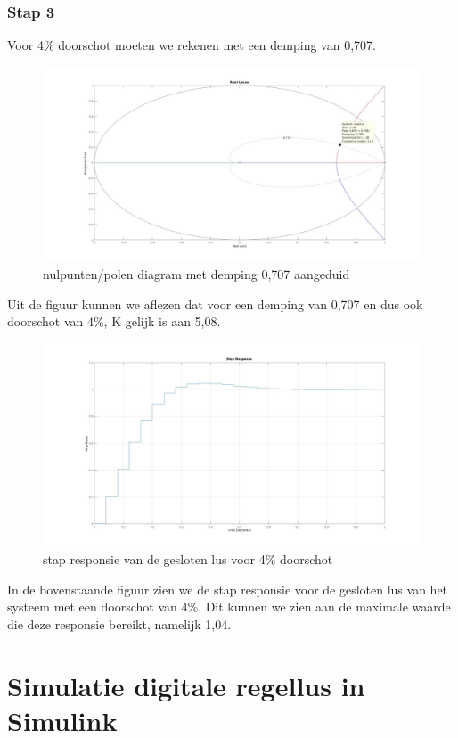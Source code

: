 \documentclass[a4paper, 12pt]{article}
\begin{document}
\subsubsection{Stap 3}

Voor 4\% doorschot moeten we rekenen met een demping van 0,707.

\begin{figure}[!h]
	\includegraphics[width=0.9\linewidth]{Labo3_4_rootlocus4.jpg}
	\caption{nulpunten/polen diagram met demping 0,707 aangeduid}
\end{figure}

Uit de figuur kunnen we aflezen dat voor een demping van 0,707 en dus ook doorschot van 4\%, K gelijk is aan 5,08.

\begin{figure}[!h]
	\includegraphics[width=1\linewidth]{Labo3_4_step_response4.jpg}
	\caption{stap responsie van de gesloten lus voor 4\% doorschot}
\end{figure}

In de bovenstaande figuur zien we de stap responsie voor de gesloten lus van het systeem met een doorschot van 4\%. Dit kunnen we zien aan de maximale waarde die deze responsie bereikt, namelijk 1,04.

\section{Simulatie digitale regellus in Simulink}
\end{document}
